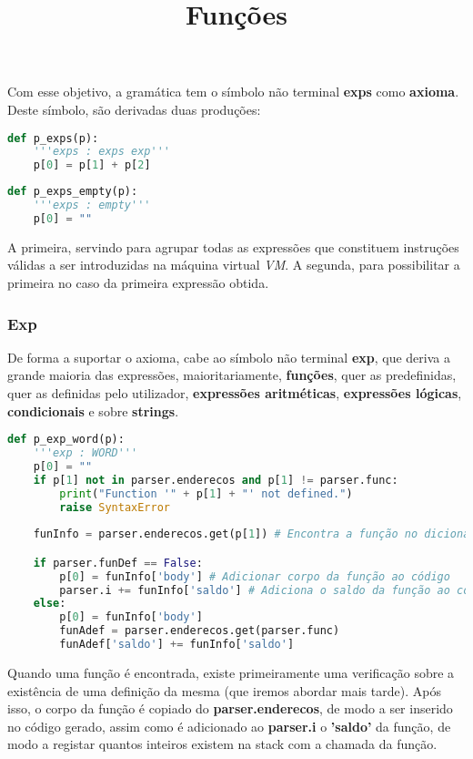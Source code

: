 \documentclass{predef}
\begin{document}
Com esse objetivo, a gramática tem o símbolo não terminal \textbf{exps} como \textbf{axioma}. Deste símbolo, são derivadas duas produções:

\begin{lstlisting}[language=Python]
def p_exps(p):
    '''exps : exps exp'''
    p[0] = p[1] + p[2]
\end{lstlisting}

\begin{lstlisting}[language=Python]
def p_exps_empty(p):
    '''exps : empty'''
    p[0] = ""
\end{lstlisting}

A primeira, servindo para agrupar todas as expressões que constituem instruções válidas a ser introduzidas na máquina virtual \textit{VM}. A segunda, para possibilitar a primeira no caso da primeira expressão obtida.

\subsubsection{Exp}
De forma a suportar o axioma, cabe ao símbolo não terminal \textbf{exp}, que deriva a grande maioria das expressões, maioritariamente, \textbf{funções}, quer as predefinidas, quer as definidas pelo utilizador, \textbf{expressões aritméticas}, \textbf{expressões lógicas}, \textbf{condicionais} e sobre \textbf{strings}.

\title{Funções}

\begin{lstlisting}[language=Python]
    def p_exp_word(p):
    '''exp : WORD'''
    p[0] = ""
    if p[1] not in parser.enderecos and p[1] != parser.func:
        print("Function '" + p[1] + "' not defined.")
        raise SyntaxError
    
    funInfo = parser.enderecos.get(p[1]) # Encontra a função no dicionário

    if parser.funDef == False:
        p[0] = funInfo['body'] # Adicionar corpo da função ao código
        parser.i += funInfo['saldo'] # Adiciona o saldo da função ao contador
    else:
        p[0] = funInfo['body']
        funAdef = parser.enderecos.get(parser.func)
        funAdef['saldo'] += funInfo['saldo']
\end{lstlisting}

Quando uma função é encontrada, existe primeiramente uma verificação sobre a existência de uma definição da mesma (que iremos abordar mais tarde). Após isso, o corpo da função é copiado do \textbf{parser.enderecos}, de modo a ser inserido no código gerado, assim como é adicionado ao \textbf{parser.i} o \textbf{'saldo'} da função, de modo a registar quantos inteiros existem na stack com a chamada da função.
\end{document}
